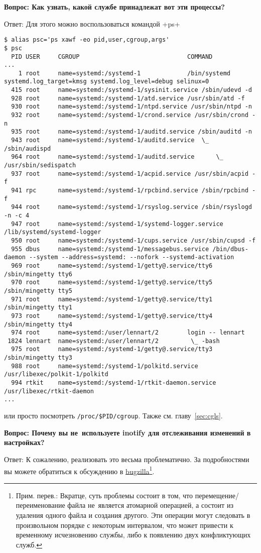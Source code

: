 \documentclass[10pt,oneside,a4paper]{article}
\newcommand{\qna}[1]{\medskip\par\textbf{Вопрос: #1}\par Ответ:}
\begin{document}
\qna{Как узнать, какой службе принадлежат вот эти процессы?}
Для этого можно воспользоваться командой +ps+
\begin{Verbatim}[fontsize=\small]
$ alias psc='ps xawf -eo pid,user,cgroup,args'
$ psc
  PID USER     CGROUP                              COMMAND
...
    1 root     name=systemd:/systemd-1             /bin/systemd systemd.log_target=kmsg systemd.log_level=debug selinux=0
  415 root     name=systemd:/systemd-1/sysinit.service /sbin/udevd -d
  928 root     name=systemd:/systemd-1/atd.service /usr/sbin/atd -f
  930 root     name=systemd:/systemd-1/ntpd.service /usr/sbin/ntpd -n
  932 root     name=systemd:/systemd-1/crond.service /usr/sbin/crond -n
  935 root     name=systemd:/systemd-1/auditd.service /sbin/auditd -n
  943 root     name=systemd:/systemd-1/auditd.service  \_ /sbin/audispd
  964 root     name=systemd:/systemd-1/auditd.service      \_ /usr/sbin/sedispatch
  937 root     name=systemd:/systemd-1/acpid.service /usr/sbin/acpid -f
  941 rpc      name=systemd:/systemd-1/rpcbind.service /sbin/rpcbind -f
  944 root     name=systemd:/systemd-1/rsyslog.service /sbin/rsyslogd -n -c 4
  947 root     name=systemd:/systemd-1/systemd-logger.service /lib/systemd/systemd-logger
  950 root     name=systemd:/systemd-1/cups.service /usr/sbin/cupsd -f
  955 dbus     name=systemd:/systemd-1/messagebus.service /bin/dbus-daemon --system --address=systemd: --nofork --systemd-activation
  969 root     name=systemd:/systemd-1/getty@.service/tty6 /sbin/mingetty tty6
  970 root     name=systemd:/systemd-1/getty@.service/tty5 /sbin/mingetty tty5
  971 root     name=systemd:/systemd-1/getty@.service/tty1 /sbin/mingetty tty1
  973 root     name=systemd:/systemd-1/getty@.service/tty4 /sbin/mingetty tty4
  974 root     name=systemd:/user/lennart/2        login -- lennart     
 1824 lennart  name=systemd:/user/lennart/2         \_ -bash
  975 root     name=systemd:/systemd-1/getty@.service/tty3 /sbin/mingetty tty3
  988 root     name=systemd:/systemd-1/polkitd.service /usr/libexec/polkit-1/polkitd
  994 rtkit    name=systemd:/systemd-1/rtkit-daemon.service /usr/libexec/rtkit-daemon
...
\end{Verbatim}
или просто посмотреть \verb+/proc/$PID/cgroup+. Также см. главу~\ref{sec:cgls}.

\qna{Почему вы не~используете inotify для отслеживания изменений в настройках?}
К сожалению, реализовать это весьма проблематично. За подробностями вы можете
обратиться к обсуждению в
\href{https://bugzilla.redhat.com/show_bug.cgi?id=615527}{bugzilla}\footnote{Прим.
перев.: Вкратце, суть проблемы состоит в том, что перемещение/переименование
файла не~является атомарной операцией, а состоит из удаления одного файла и
создания другого. Эти операции могут следовать в произвольном порядке с
некоторым интервалом, что может привести к временному исчезновению службы, либо
к появлению двух конфликтующих служб.}.
\end{document}
